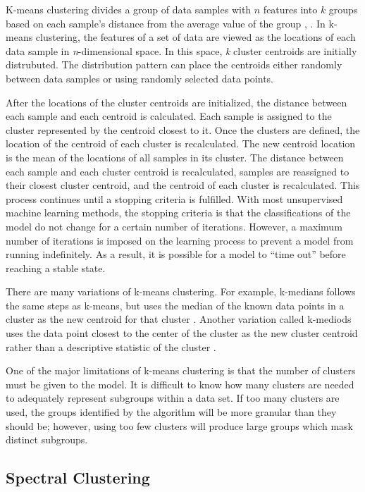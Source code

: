 K-means clustering divides a group of data samples with $n$ features into $k$ groups based on each sample's distance from the average value of the group \cite{Hartigan1979}, \cite{macqueen1967}. In k-means clustering, the features of a set of data are viewed as the locations of each data sample in \textit{n}-dimensional space. In this space, \textit{k} cluster centroids are initially distrubuted. The distribution pattern can place the centroids either randomly between data samples or using randomly selected data points.

After the locations of the cluster centroids are initialized, the distance between each sample and each centroid is calculated. Each sample is assigned to the cluster represented by the centroid closest to it. Once the clusters are defined, the location of the centroid of each cluster is recalculated. The new centroid location is the mean of the locations of all samples in its cluster. The distance between each sample and each cluster centroid is recalculated, samples are reassigned to their closest cluster centroid, and the centroid of each cluster is recalculated. This process continues until a stopping criteria is fulfilled. With most unsupervised machine learning methods, the stopping criteria is that the classifications of the model do not change for a certain number of iterations. However, a maximum number of iterations is imposed on the learning process to prevent a model from running indefinitely. As a result, it is possible for a model to ``time out'' before reaching a stable state.

There are many variations of k-means clustering. For example, k-medians follows the same steps as k-means, but uses the median of the known data points in a cluster as the new centroid for that cluster \cite{Juan1998}. Another variation called k-mediods uses the data point closest to the center of the cluster as the new cluster centroid rather than a descriptive statistic of the cluster \cite{Kaufman1987}.

One of the major limitations of k-means clustering is that the number of clusters must be given to the model. It is difficult to know how many clusters are needed to adequately represent subgroups within a data set. If too many clusters are used, the groups identified by the algorithm will be more granular than they should be; however, using too few clusters will produce large groups which mask distinct subgroups. 



\subsection{Spectral Clustering}

